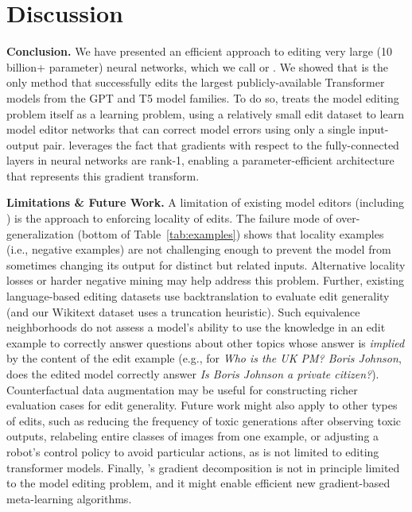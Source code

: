 \documentclass{article}
\begin{document}
\section{Discussion}

\textbf{Conclusion.} We have presented an efficient approach to editing very large (10 billion+ parameter) neural networks, which we call {\fullname} or \name. We showed that {\name} is the only method that successfully edits the largest publicly-available Transformer models from the GPT and T5 model families. To do so, {\name} treats the model editing problem itself as a learning problem, using a relatively small edit dataset to learn model editor networks that can correct model errors using only a single input-output pair. {\name} leverages the fact that gradients with respect to the fully-connected layers in neural networks are rank-1, enabling a parameter-efficient architecture that represents this gradient transform.

\textbf{Limitations \& Future Work.} A limitation of existing model editors (including \name) is the approach to enforcing locality of edits. The failure mode of over-generalization (bottom of Table~\ref{tab:examples}) shows that locality examples (i.e., negative examples) are not challenging enough to prevent the model from sometimes changing its output for distinct but related inputs. Alternative locality losses or harder negative mining may help address this problem. Further, existing language-based editing datasets use backtranslation to evaluate edit generality (and our Wikitext dataset uses a truncation heuristic). Such equivalence neighborhoods do not assess a model's ability to use the knowledge in an edit example to correctly answer questions about other topics whose answer is \textit{implied} by the content of the edit example (e.g., for \textit{Who is the UK PM? Boris Johnson}, does the edited model correctly answer \textit{Is Boris Johnson a private citizen?}). Counterfactual data augmentation \citep{Kaushik2020Learning} may be useful for constructing richer evaluation cases for edit generality. Future work might also apply {\name} to other types of edits, such as reducing the frequency of toxic generations after observing toxic outputs, relabeling entire classes of images from one example, or adjusting a robot's control policy to avoid particular actions, as {\name} is not limited to editing transformer models. Finally, \name's gradient decomposition is not in principle limited to the model editing problem, and it might enable efficient new gradient-based meta-learning algorithms.
\end{document}
